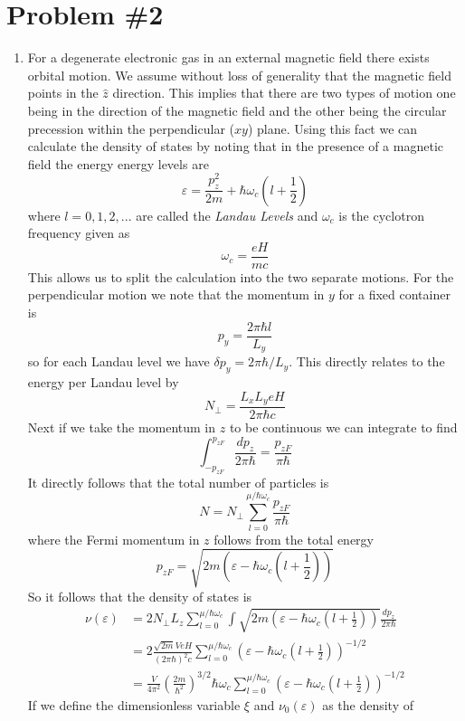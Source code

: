 \documentclass[11pt]{article}
\numberwithin{equation}{section}
\begin{document}
\section{Problem \#2}
\begin{enumerate}[(1)]
\item For a degenerate electronic gas in an external magnetic field there exists orbital 
motion. We assume without loss of generality that the magnetic field points in the $\hat{z}$ 
direction. This implies that there are two types of motion one being in the direction of 
the magnetic field and the other being the circular precession within the perpendicular 
($xy$) plane. Using this fact we can calculate the density of states by noting that in the
presence of a magnetic field the energy energy levels are
$$\varepsilon = \frac{p_z^2}{2m} + \hbar\omega_c\left(l+\frac{1}{2}\right)$$
where $l=0,1,2,...$ are called the \emph{Landau Levels} and $\omega_c$ is the cyclotron 
frequency given as
$$\omega_c = \frac{eH}{mc}$$
This allows us to split the calculation into the two separate motions. For the 
perpendicular motion we note that the momentum in $y$ for a fixed container is
$$p_y = \frac{2\pi\hbar{l}}{L_y}$$
so for each Landau level we have $\delta{p_y} = 2\pi\hbar/L_y$. This directly relates
to the energy per Landau level by
$$N_{\perp} = \frac{L_xL_yeH}{2\pi\hbar{c}}$$
Next if we take the momentum in $z$ to be continuous we can integrate to find 
$$\int_{-p_{zF}}^{p_{zF}}\frac{dp_z}{2\pi\hbar} = \frac{p_{zF}}{\pi\hbar}$$
It directly follows that the total number of particles is
$$N = N_{\perp}\sum_{l=0}^{\mu/\hbar\omega_c}\frac{p_{zF}}{\pi\hbar}$$
where the Fermi momentum in $z$ follows from the total energy 
$$p_{zF} = \sqrt{2m\left(\varepsilon-\hbar\omega_c\left(l+\frac{1}{2}\right)\right)}$$
So it follows that the density of states is 
\begin{align*}
\nu(\varepsilon) &= 2N_{\perp}L_z\sum_{l=0}^{\mu/\hbar\omega_c}\int\sqrt{2m\left(\varepsilon-\hbar\omega_c\left(l+\frac{1}{2}\right)\right)}\frac{dp_z}{2\pi\hbar}\\
&= 2\frac{\sqrt{2m}VeH}{(2\pi\hbar)^2c}\sum_{l=0}^{\mu/\hbar\omega_c}\left(\varepsilon-\hbar\omega_c\left(l+\frac{1}{2}\right)\right)^{-1/2}\\
&= \frac{V}{4\pi^2}\left(\frac{2m}{\hbar^2}\right)^{3/2}\hbar\omega_c\sum_{l=0}^{\mu/\hbar\omega_c}\left(\varepsilon-\hbar\omega_c\left(l+\frac{1}{2}\right)\right)^{-1/2}
\end{align*}
If we define the dimensionless variable $\xi$ and $\nu_0(\varepsilon)$ as the density of 

\end{enumerate}
\end{document}

